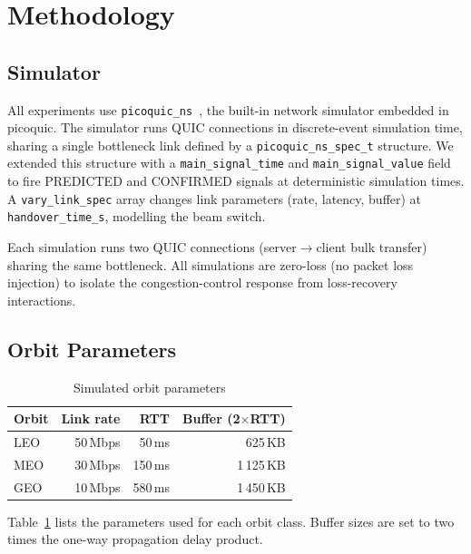 \documentclass[conference]{IEEEtran}
\begin{document}
\section{Methodology}
\label{sec:methodology}

\subsection{Simulator}

All experiments use \texttt{picoquic\_ns}~\cite{huitema2023picoquic},
the built-in network simulator embedded in picoquic.
The simulator runs QUIC connections in discrete-event simulation time,
sharing a single bottleneck link defined by a \texttt{picoquic\_ns\_spec\_t}
structure.
We extended this structure with a \texttt{main\_signal\_time} and
\texttt{main\_signal\_value} field to fire PREDICTED and CONFIRMED signals
at deterministic simulation times.
A \texttt{vary\_link\_spec} array changes link parameters (rate, latency,
buffer) at \texttt{handover\_time\_s}, modelling the beam switch.

Each simulation runs two QUIC connections (server$\to$client bulk transfer)
sharing the same bottleneck.
All simulations are zero-loss (no packet loss injection) to isolate the
congestion-control response from loss-recovery interactions.

\subsection{Orbit Parameters}
\label{sec:orbits}

\begin{table}[t]
\centering
\caption{Simulated orbit parameters}
\label{tab:orbits}
\small
\begin{tabular}{lrrr}
\toprule
Orbit & Link rate & RTT  & Buffer (2$\times$RTT) \\
\midrule
LEO   & 50\,Mbps  & 50\,ms  & 625\,KB \\
MEO   & 30\,Mbps  & 150\,ms & 1\,125\,KB \\
GEO   & 10\,Mbps  & 580\,ms & 1\,450\,KB \\
\bottomrule
\end{tabular}
\end{table}

Table~\ref{tab:orbits} lists the parameters used for each orbit class.
Buffer sizes are set to two times the one-way propagation delay product.
\end{document}
